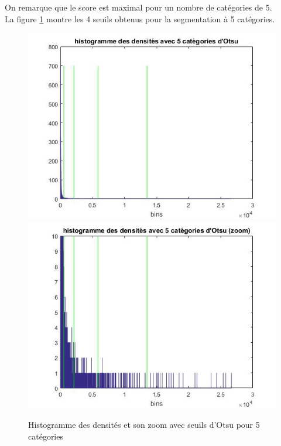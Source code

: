\documentclass{book}
\begin{document}
On remarque que le score est maximal pour un nombre de catégories de 5.\\
La figure \ref{densite_histo_otsu} montre les 4 seuils obtenus pour la segmentation à 5 catégories.
\begin{figure}[H]
\begin{center}
\includegraphics[scale=0.5]{images/densite_histo_otsu.jpg}
\includegraphics[scale=0.5]{images/densite_histo_otsu_zoom.jpg}
\end{center}
\caption{Histogramme des densités et son zoom avec seuils d'Otsu pour 5 catégories}
\label{densite_histo_otsu}
\end{figure}
\clearpage
\end{document}
